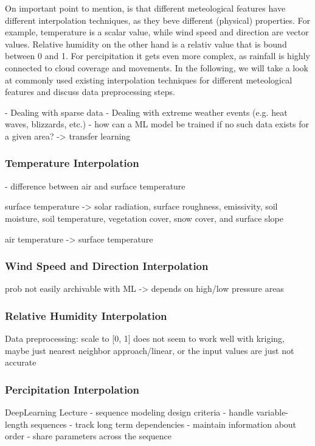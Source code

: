 On important point to mention, is that different meteological features have different interpolation techniques, as they beve different (physical) properties. For example, temperature is a scalar value, while wind speed and direction are vector values. Relative humidity on the other hand is a relativ value that is bound between 0 and 1. For percipitation it gets even more complex, as rainfall is highly connected to cloud coverage and movements. In the following, we will take a look at commonly used existing interpolation techniques for different meteological features and discuss data preprocessing steps.

- Dealing with sparse data
- Dealing with extreme weather events (e.g. heat waves, blizzards, etc.)
- how can a ML model be trained if no such data exists for a given area? -> transfer learning

\subsubsection{Temperature Interpolation}
- difference between air and surface temperature

surface temperature -> solar radiation, surface roughness, emissivity, soil moisture, soil temperature, vegetation cover, snow cover, and surface slope

air temperature -> surface temperature

\subsubsection{Wind Speed and Direction Interpolation}
prob not easily archivable with ML -> depends on high/low pressure areas

\subsubsection{Relative Humidity Interpolation}
Data preprocessing: scale to [0, 1]
does not seem to work well with kriging, maybe just nearest neighbor approach/linear, or the input values are just not accurate

\subsubsection{Percipitation Interpolation}

DeepLearning Lecture
- sequence modeling design criteria
    - handle variable-length sequences
    - track long term dependencies
    - maintain information about order
    - share parameters across the sequence

